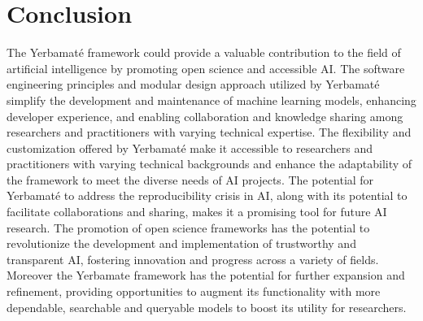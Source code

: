 \section{Conclusion}





The Yerbamaté framework could provide a valuable contribution to the field of artificial intelligence by promoting open science and accessible AI. The software engineering principles and modular design approach utilized by Yerbamaté simplify the development and maintenance of machine learning models, enhancing developer experience, and enabling collaboration and knowledge sharing among researchers and practitioners with varying technical expertise. The flexibility and customization offered by Yerbamaté make it accessible to researchers and practitioners with varying technical backgrounds and enhance the adaptability of the framework to meet the diverse needs of AI projects. The potential for Yerbamaté to address the reproducibility crisis in AI, along with its potential to facilitate collaborations and sharing, makes it a promising tool for future AI research. The promotion of open science frameworks has the potential to revolutionize the development and implementation of trustworthy and transparent AI, fostering innovation and progress across a variety of fields. Moreover the Yerbamate framework has the potential for further expansion and refinement, providing opportunities to augment its functionality with more dependable, searchable and queryable models to boost its utility for researchers.

